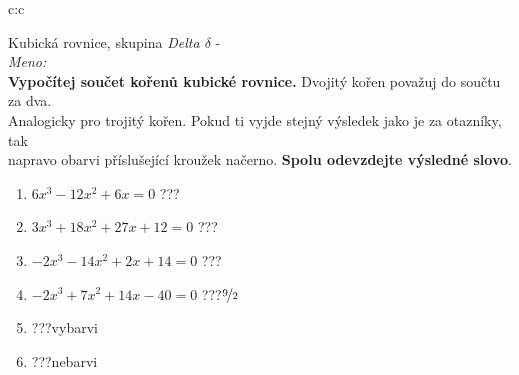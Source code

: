 \documentclass[10pt]{report}
\begin{document}
\clearpage
\thispagestyle{empty}
\begin{tabular}{c:c}
\begin{minipage}[c][99mm][t]{0.49\linewidth}
\begin{center}
\vspace{7mm}
{\huge Kubická rovnice, skupina \textit{Delta $\delta$} -}\\[4.5mm]
\textit{Meno:}\phantom{xxxxxxxxxxxxxxxxxxxxxxxxxxxxxxxxxxxxxxxxxxxxxxxxxxxxxxxxxxxxxxxxx}\\[3.5mm]
\textbf{Vypočítej součet kořenů kubické rovnice.} Dvojitý kořen považuj do součtu za dva.\\Analogicky pro trojitý kořen. Pokud ti vyjde stejný výsledek jako je za otazníky, tak\\napravo obarvi příslušející kroužek načerno. \textbf{Spolu odevzdejte výsledné slovo}.\\[3mm]
\begin{minipage}{0.77\linewidth}
\begin{center}
\begin{varwidth}{\textwidth}
\begin{enumerate}
\large
\item $6x^3-12x^2+6x=0$\quad \dotfill\; ???\;\dotfill {}
\item $3x^3+18x^2+27x+12=0$\quad \dotfill\; ???\;\dotfill {}
\item $-2x^3-14x^2+2x+14=0$\quad \dotfill\; ???\;\dotfill {}
\item $-2x^3+7x^2+14x-40=0$\quad \dotfill\; ???\;\dotfill \quad $\nicefrac{9}{2}$
\item \quad \dotfill\; ???\;\dotfill \quad vybarvi
\item \quad \dotfill\; ???\;\dotfill \quad nebarvi
\end{enumerate}
\end{varwidth}
\end{center}
\end{minipage}
\begin{minipage}{0.20\linewidth}
\begin{center}

\end{center}
\end{minipage}
\end{center}
\end{minipage}
\end{tabular}
\end{document}
